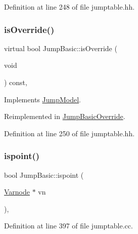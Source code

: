 Definition at line 248 of file jumptable.\+hh.

\mbox{\label{class_jump_basic_a9f923a2aaeb571981a8ae758670d20f5}} 
\subsubsection{\texorpdfstring{isOverride()}{isOverride()}}
{\footnotesize\ttfamily virtual bool Jump\+Basic\+::is\+Override (\begin{DoxyParamCaption}\item[{void}]{ }\end{DoxyParamCaption}) const\hspace{0.3cm}{\ttfamily [inline]}, {\ttfamily [virtual]}}



Implements \mbox{\hyperlink{class_jump_model_af54c70c0bcedfcf45ed1ce6895d9e2db}{Jump\+Model}}.



Reimplemented in \mbox{\hyperlink{class_jump_basic_override_a5ab5ce54ef01c3839fe62f97c967cbd2}{Jump\+Basic\+Override}}.



Definition at line 250 of file jumptable.\+hh.

\mbox{\label{class_jump_basic_a1a00a767da59463a1b552a9fc6760156}} 
\subsubsection{\texorpdfstring{ispoint()}{ispoint()}}
{\footnotesize\ttfamily bool Jump\+Basic\+::ispoint (\begin{DoxyParamCaption}\item[{\mbox{\hyperlink{class_varnode}{Varnode}} $\ast$}]{vn }\end{DoxyParamCaption})\hspace{0.3cm}{\ttfamily [static]}, {\ttfamily [protected]}}



Definition at line 397 of file jumptable.\+cc.

